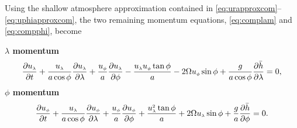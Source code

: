 Using the shallow atmosphere approximation contained in \eqref{eq:urapproxcom}--\eqref{eq:uphiapproxcom}, the two remaining momentum equations, \eqref{eq:complam} and \eqref{eq:compphi}, become

{\bfseries $\lambda$ momentum}
\begin{equation}
\dulamd{t} + \frac{\ulam}{a\cos\phi}\dulamd{\lambda}+\frac{\uphi}{a}\dulamd{\phi}-\frac{\ulam\uphi\tan\phi}{a}-2\Omega\uphi\sin\phi+\frac{g}{a\cos\phi}\dhd{\lambda}= 0, \label{eq:complam1}
\end{equation}
{\bfseries $\phi$ momentum}
\begin{equation}
\duphid{t}+ \frac{\ulam}{a\cos\phi}\duphid{\lambda}+\frac{\uphi}{a}\duphid{\phi}+\frac{\ulams\tan\phi}{a}+2\Omega\ulam\sin\phi+\frac{g}{a}\dhd{\phi}= 0. \label{eq:compphi1}
\end{equation}

